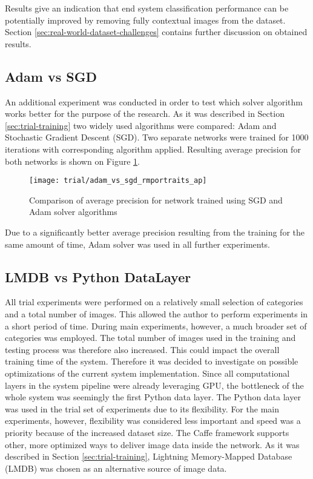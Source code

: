     
    Results give an indication that end system classification performance can be potentially improved by removing fully contextual images from the dataset. Section \ref{sec:real-world-dataset-challenges} contains further discussion on obtained results.

    
\subsection{Adam vs SGD}
    An additional experiment was conducted in order to test which solver algorithm works better for the purpose of the research. As it was described in Section \ref{sec:trial-training} two widely used algorithms were compared: Adam and Stochastic Gradient Descent (SGD). Two separate networks were trained for 1000 iterations with corresponding algorithm applied. Resulting average precision for both networks is shown on Figure \ref{fig:trial-sgd-vs-adam}.

    \begin{figure}[H]
        \centering
        \texttt{[image: trial/adam\_vs\_sgd\_rmportraits\_ap]}
        \caption{Comparison of average precision for network trained using SGD and Adam solver algorithms}
        \label{fig:trial-sgd-vs-adam}
    \end{figure}
    
    Due to a significantly better average precision resulting from the training for the same amount of time, Adam solver was used in all further experiments.
    
    
\subsection{LMDB vs Python DataLayer}
    All trial experiments were performed on a relatively small selection of categories and a total number of images. This allowed the author to perform experiments in a short period of time. During main experiments, however, a much broader set of categories was employed. The total number of images used in the training and testing process was therefore also increased. This could impact the overall training time of the system. Therefore it was decided to investigate on possible optimizations of the current system implementation. Since all computational layers in the system pipeline were already leveraging GPU, the bottleneck of the whole system was seemingly the first Python data layer. The Python data layer was used in the trial set of experiments due to its flexibility. For the main experiments, however, flexibility was considered less important and speed was a priority because of the increased dataset size. The Caffe framework supports other, more optimized ways to deliver image data inside the network. As it was described in Section \ref{sec:trial-training}, Lightning Memory-Mapped Database (LMDB) was chosen as an alternative source of image data.
    
